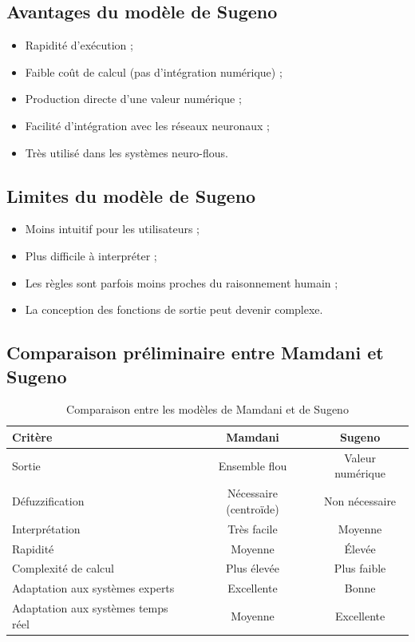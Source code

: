 \documentclass[a4paper,12pt]{report} %
\begin{document}
\subsection{Avantages du modèle de Sugeno}

\begin{itemize}
\item Rapidité d'exécution ;
\item Faible coût de calcul (pas d'intégration numérique) ;
\item Production directe d'une valeur numérique ;
\item Facilité d'intégration avec les réseaux neuronaux ;
\item Très utilisé dans les systèmes neuro-flous.
\end{itemize}

\subsection{Limites du modèle de Sugeno}

\begin{itemize}
\item Moins intuitif pour les utilisateurs ;
\item Plus difficile à interpréter ;
\item Les règles sont parfois moins proches du raisonnement humain ;
\item La conception des fonctions de sortie peut devenir complexe.
\end{itemize}

\subsection{Comparaison préliminaire entre Mamdani et Sugeno}

\begin{table}[H]
\centering
\caption{Comparaison entre les modèles de Mamdani et de Sugeno}
\begin{tabular}{|l|c|c|}
\hline
\textbf{Critère} & \textbf{Mamdani} & \textbf{Sugeno} \\
\hline
Sortie & Ensemble flou & Valeur numérique \\
Défuzzification & Nécessaire (centroïde) & Non nécessaire \\
Interprétation & Très facile & Moyenne \\
Rapidité & Moyenne & Élevée \\
Complexité de calcul & Plus élevée & Plus faible \\
Adaptation aux systèmes experts & Excellente & Bonne \\
Adaptation aux systèmes temps réel & Moyenne & Excellente \\
\hline
\end{tabular}
\end{table}
\end{document}
